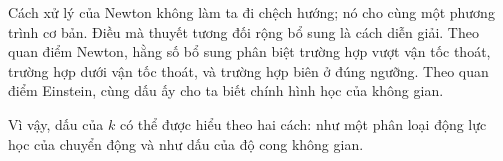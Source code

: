 Cách xử lý của Newton không làm ta đi chệch hướng; nó cho cùng một phương trình cơ bản. Điều mà thuyết tương đối rộng bổ sung là cách diễn giải. Theo quan điểm Newton, hằng số bổ sung phân biệt trường hợp vượt vận tốc thoát, trường hợp dưới vận tốc thoát, và trường hợp biên ở đúng ngưỡng. Theo quan điểm Einstein, cùng dấu ấy cho ta biết chính hình học của không gian.

\begin{classroomqa}
\end{classroomqa}

Vì vậy, dấu của \(k\) có thể được hiểu theo hai cách: như một phân loại động lực học của chuyển động và như dấu của độ cong không gian.